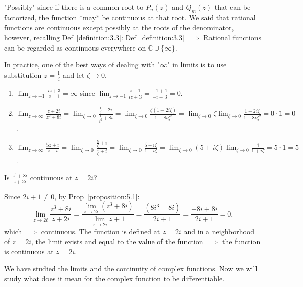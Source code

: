 "Possibly" since if there is a common root to $P_n(z)$ and $Q_m(z)$ that can be factorized, the function *may* be continuous at that root. We said that rational functions are continuous except possibly at the roots of the denominator, however, recalling Def~\ref{definition:3.3}: Def~\ref{definition:3.3} $\implies$ Rational functions can be regarded as continuous everywhere on $\mathbb{C} \cup \{\infty\}$.

In practice, one of the best ways of dealing with "$\infty$" in limits is to use substitution $z = \frac{1}{\zeta}$ and let $\zeta \to 0$.

\begin{example}\label{example:7.3}
    \begin{enumerate}
     \item $\lim_{z \to -1} \frac{iz + 3}{z + 1} = \infty$ since $\lim_{z \to -1} \frac{z + 1}{iz + 3} = \frac{-1 + 1}{-i + 3} = 0$.
    \item $\lim_{z \to \infty} \frac{z + 2i}{z^2 + 8i} = \lim_{\zeta \to 0} \frac{\frac{1}{\zeta} + 2i}{\frac{1}{\zeta^2} + 8i} = \lim_{\zeta \to 0} \frac{\zeta(1 + 2i\zeta)}{1 + 8i\zeta^2} = \lim_{\zeta \to 0} \zeta \lim_{\zeta \to 0} \frac{1 + 2i\zeta}{1 + 8i\zeta^2} = 0 \cdot 1 = 0$.
    \item $\lim_{z \to \infty} \frac{5z + i}{z + i} = \lim_{\zeta \to 0} \frac{\frac{5}{\zeta} + i}{\frac{1}{\zeta} + i} = \lim_{\zeta \to 0} \frac{5 + i\zeta}{1 + i\zeta} = \lim_{\zeta \to 0} (5 + i\zeta) \lim_{\zeta \to 0} \frac{1}{1 + i\zeta} = 5 \cdot 1 = 5$.
\end{enumerate}
\end{example}
\begin{example}\label{example:7.4} 
    Is $\frac{z^3 + 8i}{z + 2i}$ continuous at $z = 2i$?

\begin{soln}  Since $2i + 1 \neq 0$, by Prop~\ref{proposition:5.1}: \[ \lim_{z \to 2i} \frac{z^3 + 8i}{z + 2i} = \frac{\lim_{z \to 2i} (z^3 + 8i)}{\lim_{z \to 2i} z + 1} = \frac{(8i^3 + 8i)}{2i + 1} = \frac{-8i + 8i}{2i + 1} = 0, \] which $\implies$ continuous. The function is defined at $z = 2i$ and in a neighborhood of $z = 2i$, the limit exists and equal to the value of the function $\implies$ the function is continuous at $z = 2i$.
\end{soln}

\end{example}
We have studied the limits and the continuity of complex functions. Now we will study what does it mean for the complex function to be differentiable.

